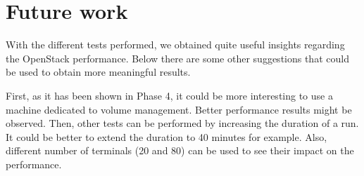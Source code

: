 \section{Future work}
With the different tests performed, we obtained quite useful insights regarding the OpenStack performance.
Below there are some other suggestions that could be used to obtain more meaningful results.

First, as it has been shown in Phase 4, it could be more interesting to use a machine dedicated to volume management.
Better performance results might be observed.
Then, other tests can be performed by increasing the duration of a run. 
It could be better to extend the duration to 40 minutes for example.
Also, different number of terminals (20 and 80) can be used to see their impact on the performance.






